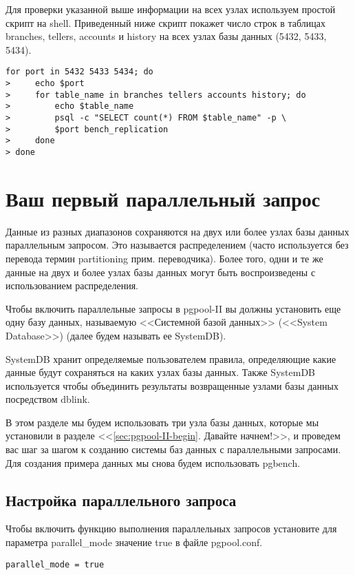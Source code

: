 Для проверки указанной выше информации на всех узлах используем простой скрипт на shell.
Приведенный ниже скрипт покажет число строк в таблицах branches, tellers, accounts и history
на всех узлах базы данных (5432, 5433, 5434).
\begin{lstlisting}[label=lst:pgpool21,caption=Проверка репликации]
for port in 5432 5433 5434; do
>     echo $port
>     for table_name in branches tellers accounts history; do
>         echo $table_name
>         psql -c "SELECT count(*) FROM $table_name" -p \
>         $port bench_replication
>     done
> done
\end{lstlisting}


\section{Ваш первый параллельный запрос}
Данные из разных диапазонов сохраняются на двух или более узлах базы данных параллельным запросом.
Это называется распределением (часто используется без перевода термин partitioning прим. переводчика).
Более того, одни и те же данные на двух и более узлах базы данных могут быть воспроизведены с использованием распределения.

Чтобы включить параллельные запросы в pgpool-II вы должны установить еще одну базу данных, называемую
<<Системной базой данных>> (<<System Database>>) (далее будем называть ее SystemDB).

SystemDB хранит определяемые пользователем правила, определяющие какие данные будут сохраняться на каких узлах базы данных.
Также SystemDB используется чтобы объединить результаты возвращенные узлами базы данных посредством dblink.

В этом разделе мы будем использовать три узла базы данных, которые мы установили в разделе <<\ref{sec:pgpool-II-begin}.
Давайте начнем!>>, и проведем вас шаг за шагом к созданию системы баз данных с параллельными запросами.
Для создания примера данных мы снова будем использовать pgbench.

\subsection{Настройка параллельного запроса}
Чтобы включить функцию выполнения параллельных запросов установите для параметра parallel\_mode значение true в файле pgpool.conf.
\begin{lstlisting}[label=lst:pgpool22,caption=Настройка параллельного запроса]
parallel_mode = true
\end{lstlisting}

